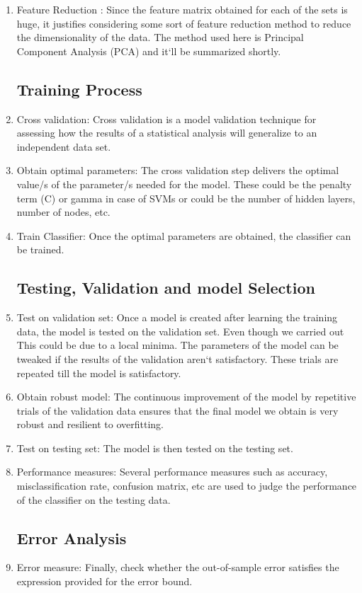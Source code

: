 \documentclass[letterpaper,12pt, onecolumn]{article}%
\begin{document}
\begin{enumerate}
  \item Feature Reduction : Since the feature matrix obtained for each of the sets is huge, it justifies considering some sort of feature reduction method to reduce the dimensionality of the data. The method used here is Principal Component Analysis (PCA) and it`ll be summarized shortly.
  
\subsection*{Training Process}
\item Cross validation: Cross validation is a model validation technique for assessing how the results of a statistical analysis will generalize to an independent data set.

\item Obtain optimal parameters: The cross validation step delivers the optimal value/s of the parameter/s needed for the model. These could be the penalty term (C) or gamma in case of SVMs or could be the number of hidden layers, number of nodes, etc. 

\item Train Classifier: Once the optimal parameters are obtained, the classifier can be trained.

\subsection*{Testing, Validation and model Selection}
\item Test on validation set: Once a model is created after learning the training data, the model is tested on the validation set. Even though we carried out This could be due to a local minima. The parameters of the model can be tweaked if the results of the validation aren`t satisfactory. These trials are repeated till the model is satisfactory.

\item Obtain robust model: The continuous improvement of the model by repetitive trials of the validation data ensures that the final model we obtain is very robust and resilient to overfitting.

\item Test on testing set: The model is then tested on the testing set.

\item Performance measures: Several performance measures such as accuracy, misclassification rate, confusion matrix, etc are used to judge the performance of the classifier on the testing data. 

\subsection*{Error Analysis}
\item Error measure: Finally, check whether the out-of-sample error satisfies the expression provided for the error bound.
 
\end{enumerate}
\end{document}
